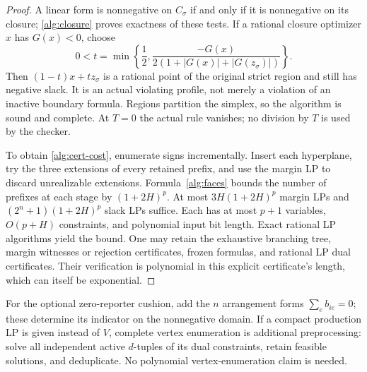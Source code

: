 \begin{proof}
A linear form is nonnegative on $C_\sigma$ if and only if it is nonnegative
on its closure; \eqref{alg:closure} proves exactness of these tests.
If a rational closure optimizer $x$ has $G(x)<0$, choose
\[
 0<t=\min\left\{\frac12,
       \frac{-G(x)}{2(1+|G(x)|+|G(z_\sigma)|)}\right\}.
\]
Then $(1-t)x+t z_\sigma$ is a rational point of the original strict region
and still has negative slack.  It is an actual violating profile, not merely
a violation of an inactive boundary formula.  Regions partition the simplex,
so the algorithm is sound and complete.  At $T=0$ the actual rule vanishes;
no division by $T$ is used by the checker.

To obtain \eqref{alg:cert-cost}, enumerate signs incrementally.  Insert each
hyperplane, try the three extensions of every retained prefix, and use the
margin LP to discard unrealizable extensions.  Formula~\eqref{alg:faces}
bounds the number of prefixes at each stage by $(1+2H)^p$.
At most $3H(1+2H)^p$ margin LPs and
$(2^n+1)(1+2H)^p$ slack LPs suffice.  Each has at most $p+1$ variables,
$O(p+H)$ constraints, and polynomial input bit length.  Exact rational LP
algorithms yield the bound.  One may retain the exhaustive branching tree,
margin witnesses or rejection certificates, frozen formulas, and rational
LP dual certificates.  Their verification is polynomial in this explicit
certificate's length, which can itself be exponential.
\end{proof}
For the optional zero-reporter cushion, add the $n$ arrangement forms
$\sum_e b_{ie}=0$; these determine its indicator on the nonnegative domain.
If a compact production LP is given instead of $V$, complete vertex
enumeration is additional preprocessing: solve all independent active
$d$-tuples of its dual constraints, retain feasible solutions, and deduplicate.
No polynomial vertex-enumeration claim is needed.

